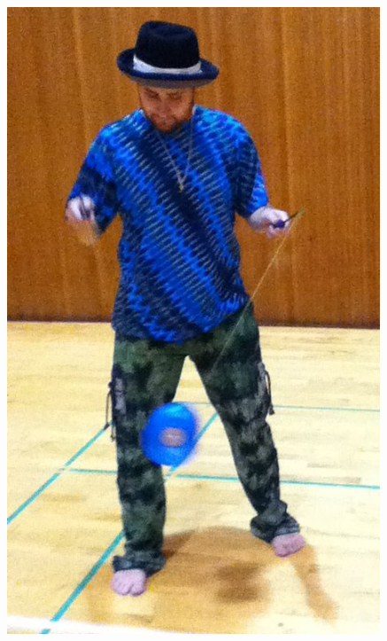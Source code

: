 \documentclass{beamer}
\begin{document}
\begin{frame}
\begin{columns}
\begin{center}
		\includegraphics[width = 0.9\textwidth]{images/circus diabolo.png}
		\end{center}
	\end{columns}
\end{frame}
		
\end{document}
